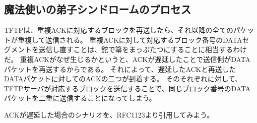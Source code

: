 \subsection{魔法使いの弟子シンドロームのプロセス}

TFTPは、重複ACKに対応するブロックを再送したら、それ以降の全てのパケットが重複して送信される。
重複ACKに対して対応するブロック番号のDATAセグメントを送信し直すことは、鉈で箒をまっぷたつにすることに相当するわけだ。
重複ACKがなぜ生じるかというと、ACKが遅延したことで送信側がDATAパケットを再送するからである。
それによって、遅延したACKと再送したDATAパケットに対してのACKの二つが到着する。
そのそれぞれに対して、TFTPサーバが対応するブロックを送信することで、同じブロック番号のDATAパケットを二重に送信することになってしまう。

ACKが遅延した場合のシナリオを、RFC1123より引用してみよう。

